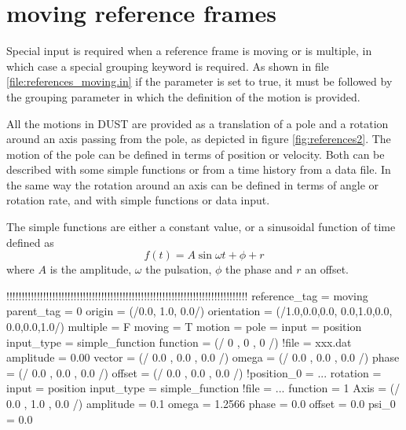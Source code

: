 \section{moving reference frames}
Special input is required when a reference frame is moving or is multiple, in which case a special grouping keyword is required. As shown in file \ref{file:references_moving.in} if the parameter  is set to true, it must be followed by the grouping parameter  in which the definition of the motion is provided. 

All the motions in DUST are provided as a translation of a pole and a rotation around an axis passing from the pole, as depicted in figure \ref{fig:references2}. The motion of the pole can be defined in terms of position or velocity. Both can be described with some simple functions or from a time history from a data file.
In the same way the rotation around an axis can be defined in terms of angle or rotation rate, and with simple functions or data input.

The simple functions are either a constant value, or a sinusoidal function of time defined as
\begin{equation}
f(t) = A \sin{\omega t + \phi} + r 
\end{equation}
where $A$ is the amplitude, $\omega$ the pulsation, $\phi$ the phase and $r$ an offset. 

\begin{inputfile}[frame=single, caption={references\_moving.in}, label={file:references_moving.in}]
!!!!!!!!!!!!!!!!!!!!!!!!!!!!!!!!!!!!!!!!!!!!!!!!!!!!!!!!!!!!!!!!!!!!!!!!!!!!!!!
reference_tag = moving
parent_tag = 0
origin = (/0.0, 1.0, 0.0/)
orientation = (/1.0,0.0,0.0, 0.0,1.0,0.0, 0.0,0.0,1.0/)
multiple = F
moving = T
motion = {
  pole = {
    input      = position                           
    input_type = simple_function
    function   = (/  0  ,  0  ,  0  /)
    !file       = xxx.dat
    amplitude  = 0.00
    vector     = (/ 0.0 , 0.0 , 0.0 /)
    omega      = (/ 0.0 , 0.0 , 0.0 /)
    phase      = (/ 0.0 , 0.0 , 0.0 /)
    offset     = (/ 0.0 , 0.0 , 0.0 /)
    !position_0 = ...
  }
  rotation   = {
    input      = position
    input_type = simple_function
    !file = ...
    function   =  1      
    Axis       = (/ 0.0 , 1.0 , 0.0 /)  
    amplitude  = 0.1    
    omega      = 1.2566  
    phase      = 0.0  
    offset     = 0.0  
    psi_0      = 0.0           
  }
}
\end{inputfile}


